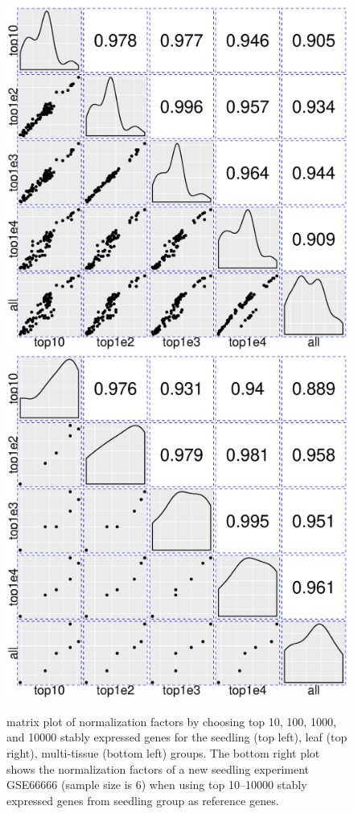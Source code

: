 \documentclass[11pt, a4paper]{article}
\begin{document}
\begin{figure}[h!]
\begin{center}
\includegraphics[scale=0.38]{Figures/norm3.eps}
\includegraphics[scale=0.38]{Figures/norm4.eps}
\caption{\label{fig:normfactor} matrix plot of normalization factors by choosing top 10, 100, 1000, and 10000 stably expressed genes for the seedling (top left), leaf (top right), multi-tissue (bottom left) groups. The bottom right plot shows the normalization factors of a new seedling experiment GSE66666 (sample size is 6) when using top 10--10000 stably expressed genes from seedling group as reference genes.}
\end{center}
\end{figure}
\end{document}
